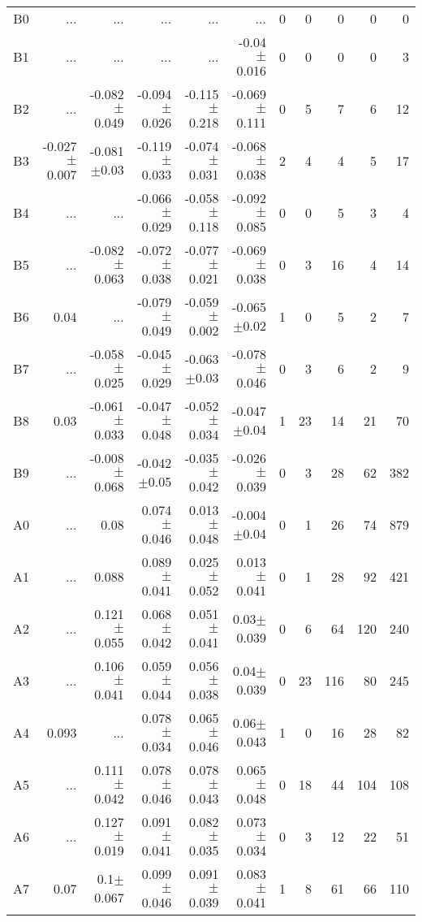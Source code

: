 \begin{table}[t]
\begin{table}[t]
\begin{center}
\begin{tabular}{c|rrrrr|rrrrr}
    B0	&	 ...	&	 ...	&	 ...	&	 ...	&	 ...	&	0	&	0	&	0	&	0	&	0	\\
    B1	&	 ...	&	 ...	&	 ...	&	 ...	&	-0.04$\pm$0.016	&	0	&	0	&	0	&	0	&	3	\\
    B2	&	 ...	&	-0.082$\pm$0.049	&	-0.094$\pm$0.026	&	-0.115$\pm$0.218	&	-0.069$\pm$0.111	&	0	&	5	&	7	&	6	&	12	\\
    B3	&	-0.027$\pm$0.007	&	-0.081$\pm$0.03	&	-0.119$\pm$0.033	&	-0.074$\pm$0.031	&	-0.068$\pm$0.038	&	2	&	4	&	4	&	5	&	17	\\
    B4	&	 ...	&	 ...	&	-0.066$\pm$0.029	&	-0.058$\pm$0.118	&	-0.092$\pm$0.085	&	0	&	0	&	5	&	3	&	4	\\
    B5	&	 ...	&	-0.082$\pm$0.063	&	-0.072$\pm$0.038	&	-0.077$\pm$0.021	&	-0.069$\pm$0.038	&	0	&	3	&	16	&	4	&	14	\\
    B6	&	0.04	&	 ...	&	-0.079$\pm$0.049	&	-0.059$\pm$0.002	&	-0.065$\pm$0.02	&	1	&	0	&	5	&	2	&	7	\\
    B7	&	 ...	&	-0.058$\pm$0.025	&	-0.045$\pm$0.029	&	-0.063$\pm$0.03	&	-0.078$\pm$0.046	&	0	&	3	&	6	&	2	&	9	\\
    B8	&	0.03	&	-0.061$\pm$0.033	&	-0.047$\pm$0.048	&	-0.052$\pm$0.034	&	-0.047$\pm$0.04	&	1	&	23	&	14	&	21	&	70	\\
    B9	&	 ...	&	-0.008$\pm$0.068	&	-0.042$\pm$0.05	&	-0.035$\pm$0.042	&	-0.026$\pm$0.039	&	0	&	3	&	28	&	62	&	382	\\
    A0	&	 ...	&	0.08	&	0.074$\pm$0.046	&	0.013$\pm$0.048	&	-0.004$\pm$0.04	&	0	&	1	&	26	&	74	&	879	\\
    A1	&	 ...	&	0.088	&	0.089$\pm$0.041	&	0.025$\pm$0.052	&	0.013$\pm$0.041	&	0	&	1	&	28	&	92	&	421	\\
    A2	&	 ...	&	0.121$\pm$0.055	&	0.068$\pm$0.042	&	0.051$\pm$0.041	&	0.03$\pm$0.039	&	0	&	6	&	64	&	120	&	240	\\
    A3	&	 ...	&	0.106$\pm$0.041	&	0.059$\pm$0.044	&	0.056$\pm$0.038	&	0.04$\pm$0.039	&	0	&	23	&	116	&	80	&	245	\\
    A4	&	0.093	&	 ...	&	0.078$\pm$0.034	&	0.065$\pm$0.046	&	0.06$\pm$0.043	&	1	&	0	&	16	&	28	&	82	\\
    A5	&	 ...	&	0.111$\pm$0.042	&	0.078$\pm$0.046	&	0.078$\pm$0.043	&	0.065$\pm$0.048	&	0	&	18	&	44	&	104	&	108	\\
    A6	&	 ...	&	0.127$\pm$0.019	&	0.091$\pm$0.041	&	0.082$\pm$0.035	&	0.073$\pm$0.034	&	0	&	3	&	12	&	22	&	51	\\
    A7	&	0.07	&	0.1$\pm$0.067	&	0.099$\pm$0.046	&	0.091$\pm$0.039	&	0.083$\pm$0.041	&	1	&	8	&	61	&	66	&	110	\\

\end{tabular}
\end{center}
\end{table}
\end{table}
